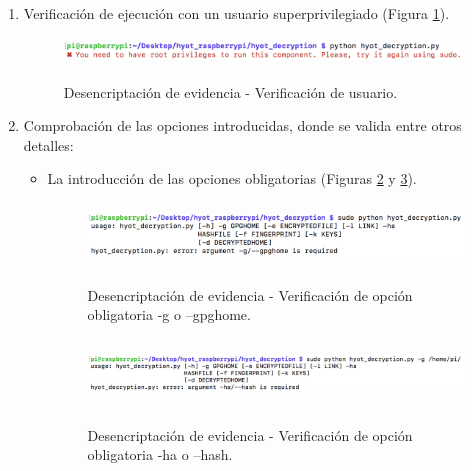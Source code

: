 \documentclass[12pt,a4paper, twoside]{report}
\begin{document}
	 \begin{enumerate}
	 	\item Verificación de ejecución con un usuario superprivilegiado (Figura \ref{fig:userguide_evidence_root}).
		
		\begin{figure}[!ht]   
			\caption{Desencriptación de evidencia - Verificación de usuario.} 
			\begin{center} 
				\includegraphics[width=12cm,height=0.7cm]{Images/userGuide/evidence/root} \\
				\label{fig:userguide_evidence_root} 
			\end{center}  
		\end{figure}
	 	
	 	\item Comprobación de las opciones introducidas, donde se valida entre otros detalles:
	 	
	 	\begin{itemize}
	 		\item La introducción de las opciones obligatorias (Figuras \ref{fig:userguide_evidence_optionmandatory1} y \ref{fig:userguide_evidence_optionmandatory2}).
	 		
	 		\begin{figure}[!ht]   
				\caption{Desencriptación de evidencia - Verificación de opción obligatoria -g o --gpghome.} 
				\begin{center} 
					\includegraphics[width=14cm,height=1.7cm]{Images/userGuide/evidence/option_mandatory1} \\
					\label{fig:userguide_evidence_optionmandatory1} 
				\end{center}  
			\end{figure}
			
			\newpage
			
			\begin{figure}[!ht]   
				\caption{Desencriptación de evidencia - Verificación de opción obligatoria -ha o --hash.} 
				\begin{center} 
					\includegraphics[width=14cm,height=1.8cm]{Images/userGuide/evidence/option_mandatory2} \\
					\label{fig:userguide_evidence_optionmandatory2} 
				\end{center}  
			\end{figure}
	 		

\end{itemize}
\end{enumerate}
\end{document}
